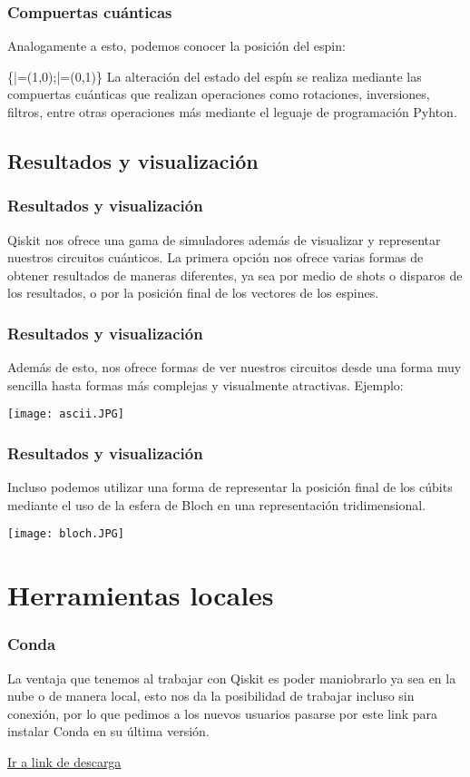 \documentclass[spanish]{beamer}
\begin{document}
\newpage\justify
\begin{frame}
\frametitle{Compuertas cuánticas}

Analogamente a esto, podemos conocer la posición del espin:

\centering\displaystyle \left\{|\uparrow \rangle =(1,0);|\downarrow \rangle =(0,1)\right\}
\justify
La alteración del estado del espín se realiza mediante las compuertas cuánticas que realizan operaciones como rotaciones, inversiones, filtros, entre otras operaciones más mediante el leguaje de programación Pyhton.
\end{frame}

\newpage\justify
\begin{frame}\subsection{Resultados y visualización}
\frametitle{Resultados y visualización}
Qiskit nos ofrece una gama de simuladores además de visualizar y representar nuestros circuitos cuánticos. La primera opción nos ofrece varias formas de obtener resultados de maneras diferentes, ya sea por medio de shots o disparos de los resultados, o por la posición final de los vectores de los espines.
\end{frame}

\newpage\justify
\begin{frame}
\frametitle{Resultados y visualización}
Además de esto, nos ofrece formas de ver nuestros circuitos desde una forma muy sencilla hasta formas más complejas y visualmente atractivas. Ejemplo:

\centering\texttt{[image: ascii.JPG]}
\end{frame}

\newpage\justify
\begin{frame}
\frametitle{Resultados y visualización}
Incluso podemos utilizar una forma de representar la posición final de los cúbits mediante el uso de la esfera de Bloch en una representación tridimensional.

\centering\texttt{[image: bloch.JPG]}
\end{frame}
\section{Herramientas locales}        
 \setlength{\parskip}{1mm}
 \begin{frame}[fragile]
 \frametitle{Conda} 
 \justify 
La ventaja que tenemos al trabajar con Qiskit es poder maniobrarlo ya sea en la nube o de manera local, esto nos da la posibilidad de trabajar incluso sin conexión, por lo que pedimos a los nuevos usuarios pasarse por este link para instalar Conda en su última versión.
 
\href{https://conda.io/projects/conda/en/latest/user-guide/install/index.html}{\textcolor{QMexicoPink}{Ir a link de descarga}}
\end{frame}
\end{document}
